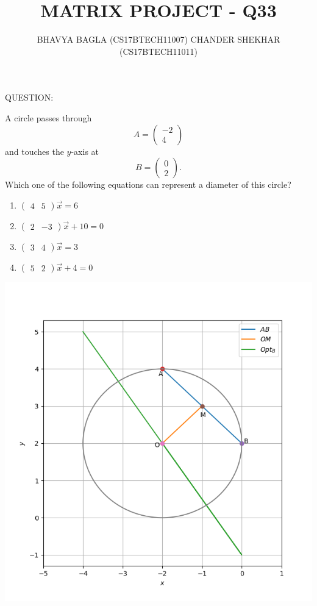 \documentclass{beamer}
\title{MATRIX PROJECT - Q33}
\author{BHAVYA BAGLA (CS17BTECH11007) \newline CHANDER SHEKHAR (CS17BTECH11011) }
\newcommand{\myvec}[1]{\ensuremath{\begin{pmatrix}#1\end{pmatrix}}}
\begin{document}
\maketitle
\begin{frame}{QUESTION:}
\item A circle passes through 
\begin{equation}
A =\myvec{-2\\ 4} 
\end{equation} 
and touches the $y$-axis at 
\begin{equation} 
B =\myvec{0\\ 2}. 
\end{equation}
Which one of the  following equations can represent a diameter of this circle?
\begin{enumerate} 
\item $\myvec{4 & 5}\vec{x} = 6 $
\item $\myvec{2 & -3}\vec{x} +10 = 0 $
\item $\myvec{3 & 4}\vec{x} = 3 $
\item $\myvec{5 & 2}\vec{x} +4= 0 $
\end{enumerate} 


\end{frame}
\begin{frame}{}
    \includegraphics[scale=0.5]{Q_33_Graph.png}
\end{frame}
\end{document}
